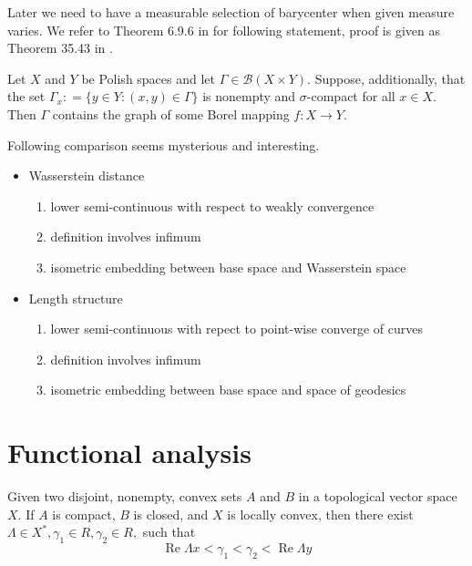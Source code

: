 Later we need to have a measurable selection of barycenter when given measure varies. We refer to Theorem 6.9.6 in \cite{Bogachev2007} for following statement, proof is given as Theorem 35.43 in \cite{kechris1995}.

\begin{thm}
	\label{thm:measurale_selection}
	Let \( X \) and \( Y \) be Polish spaces and let \( \Gamma \in \mathcal { B } ( X \times Y ) \). Suppose, additionally, that the set \( \Gamma _ { x }: = \{ y \in Y: ( x , y ) \in \Gamma \} \) is nonempty and \( \sigma \)-compact for all \( x \in X \). Then \( \Gamma \) contains the graph of some Borel mapping \( f: X \rightarrow Y\).
\end{thm}


\begin{rmk} 
	Following comparison seems mysterious and interesting.
	\begin{itemize}
		\item Wasserstein distance
		      \begin{enumerate}
			      \item lower semi-continuous with respect to weakly convergence
			      \item definition involves infimum
			      \item isometric embedding between base space and Wasserstein space
		      \end{enumerate}
		\item Length structure
		      \begin{enumerate}
			      \item lower semi-continuous with repect to point-wise converge of curves
			      \item definition involves infimum
			      \item isometric embedding between base space and space of geodesics
		      \end{enumerate}
	\end{itemize}
\end{rmk}

\section{Functional analysis}

\begin{thm}
	Given two disjoint, nonempty, convex sets $A$ and $B$ in a topological vector space $X$. If \( A \) is compact, \( B \) is closed, and \( X \) is locally convex, then there exist \( \Lambda \in X ^ { * } , \gamma _ { 1 } \in R , \gamma _ { 2 } \in R , \) such that
	\[
		\operatorname { Re } \Lambda x < \gamma _ { 1 } < \gamma _ { 2 } < \operatorname { Re } \Lambda y
	\]
\end{thm}

